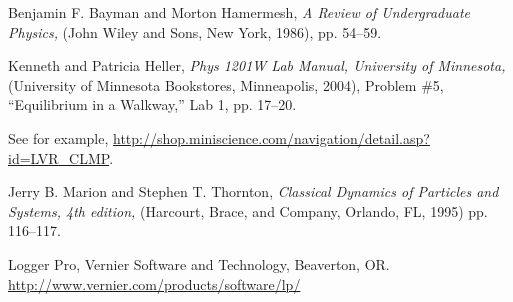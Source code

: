 \documentclass[12pt]{iopart}
\begin{document}
\begin{thebibliography}{5}
 
Benjamin F. Bayman and Morton Hamermesh,
\textit{A Review of Undergraduate Physics,}
(John Wiley and Sons, New York, 1986),
pp. 54--59.

 Kenneth and Patricia Heller,
\textit{Phys 1201W Lab Manual, University of Minnesota,}
(University of Minnesota Bookstores, Minneapolis, 2004),
Problem \#5, ``Equilibrium in a Walkway,'' Lab 1, pp. 17--20.

See for example, \href{http://shop.miniscience.com/navigation/detail.asp?id=LVR_CLMP}{http://shop.miniscience.com/navigation/detail.asp?id=LVR\_CLMP}. 

Jerry B.  Marion and Stephen T. Thornton,
\textit{Classical Dynamics of Particles and Systems, 4th edition,}
(Harcourt, Brace, and Company, Orlando, FL, 1995)
pp. 116--117.

Logger Pro,
Vernier Software and Technology, 
Beaverton, OR.
\href{http://www.vernier.com/products/software/lp/}{http://www.vernier.com/products/software/lp/}


\end{thebibliography}
\end{document}
